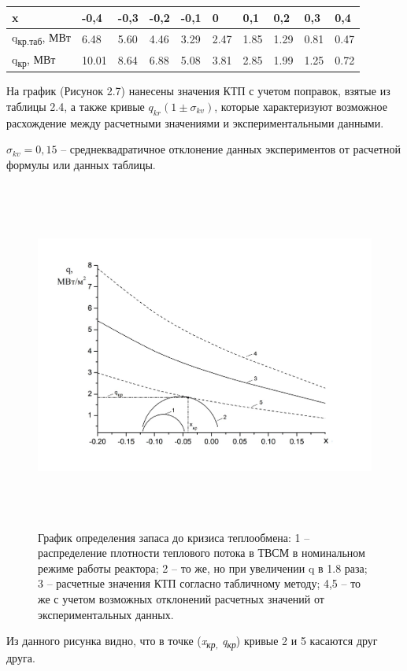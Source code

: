 \begin{longtable}[]{@{}llllllllll@{}}
\toprule
x & -0,4 & -0,3 & -0,2 & -0,1 & 0 & 0,1 & 0,2 & 0,3 & 0,4\tabularnewline
\midrule
\endhead
q\textsubscript{кр.таб}, МВт & 6.48 & 5.60 & 4.46 & 3.29 & 2.47 & 1.85 &
1.29 & 0.81 & 0.47\tabularnewline
q\textsubscript{кр}, МВт & 10.01 & 8.64 & 6.88 & 5.08 & 3.81 & 2.85 &
1.99 & 1.25 & 0.72\tabularnewline
\bottomrule
\end{longtable}

На график (Рисунок 2.7) нанесены значения КТП с учетом поправок, взятые
из таблицы 2.4, а также кривые
\(q_{kr}\left( 1 \pm \sigma_{kv} \right)\), которые характеризуют
возможное расхождение между расчетными значениями и экспериментальными
данными.

\(\sigma_{kv} = 0,15\) -- среднеквадратичное отклонение данных
экспериментов от расчетной формулы или данных таблицы.

\begin{figure}[!h]
\center
\includegraphics[width=6.49583in,height=4.53750in]{media/image11.png}
\caption{График определения запаса до кризиса теплообмена: 1 --
распределение плотности теплового потока в ТВСМ в номинальном режиме
работы реактора; 2 -- то же, но при увеличении q в 1.8 раза; 3 --
расчетные значения КТП согласно табличному методу; 4,5 -- то же с учетом
возможных отклонений расчетных значений от экспериментальных данных.}
\end{figure}

Из данного рисунка видно, что в точке (\emph{x\textsubscript{кр,}
q\textsubscript{кр}}) кривые 2 и 5 касаются друг друга.

